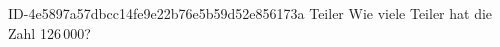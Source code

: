 \begin{exercise}
      {ID-4e5897a57dbcc14fe9e22b76e5b59d52e856173a}
      {Teiler}
  \ifproblem\problem
    Wie viele Teiler hat die Zahl 126\,000?
  \fi
\end{exercise}
